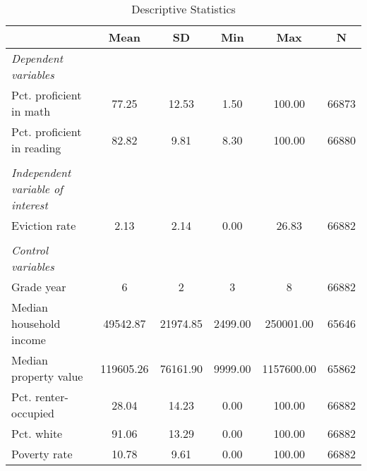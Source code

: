 \begin{table}[htbp]\centering
\def\sym#1{\ifmmode^{#1}\else\(^{#1}\)\fi}
\caption{Descriptive Statistics}
\begin{tabular}{l*{1}{ccccc}}
\toprule
                    &        Mean&          SD&         Min&         Max&           N\\
\midrule
\emph{Dependent variables}&            &            &            &            &            \\
\hspace{0.25cm} Pct. proficient in math&       77.25&       12.53&        1.50&      100.00&       66873\\
\hspace{0.25cm} Pct. proficient in reading&       82.82&        9.81&        8.30&      100.00&       66880\\
\vspace{0.1em} \\ \emph{Independent variable of interest}&            &            &            &            &            \\
\hspace{0.25cm} Eviction rate&        2.13&        2.14&        0.00&       26.83&       66882\\
\vspace{0.1em} \\ \emph{Control variables}&            &            &            &            &            \\
\hspace{0.25cm} Grade year&           6&           2&           3&           8&       66882\\
\hspace{0.25cm} Median household income&    49542.87&    21974.85&     2499.00&   250001.00&       65646\\
\hspace{0.25cm} Median property value&   119605.26&    76161.90&     9999.00&  1157600.00&       65862\\
\hspace{0.25cm} Pct. renter-occupied&       28.04&       14.23&        0.00&      100.00&       66882\\
\hspace{0.25cm} Pct. white&       91.06&       13.29&        0.00&      100.00&       66882\\
\hspace{0.25cm} Poverty rate&       10.78&        9.61&        0.00&      100.00&       66882\\

\end{tabular}
\end{table}
